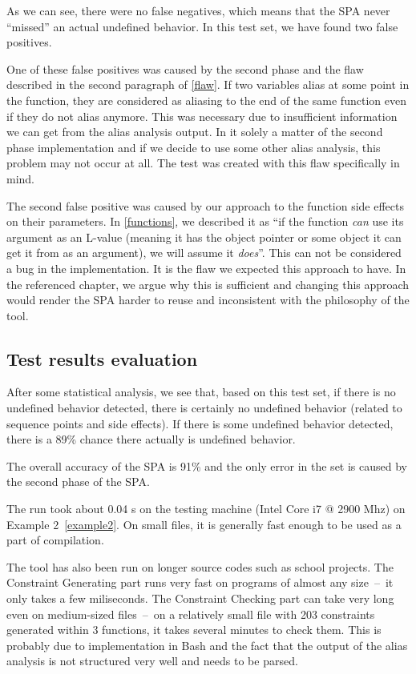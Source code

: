 As we can see, there were no false negatives, which means that the SPA never ``missed'' an actual undefined behavior. In this test set, we have found two false positives.

One of these false positives was caused by the second phase and the flaw described in the second paragraph of \ref{flaw}. If two variables alias at some point in the function, they are considered as aliasing to the end of the same function even if they do not alias anymore. This was necessary due to insufficient information we can get from the alias analysis output. In it solely a matter of the second phase implementation and if we decide to use some other alias analysis, this problem may not occur at all. The test was created with this flaw specifically in mind. %

The second false positive was caused by our approach to the function side effects on their parameters. In \ref{functions}, we described it as ``if the function \emph{can} use its argument as an L-value (meaning it has the object pointer or some object it can get it from as an argument), we will assume it \emph{does}''. This can not be considered a bug in the implementation. It is the flaw we expected this approach to have. In the referenced chapter, we argue why this is sufficient and changing this approach would render the SPA harder to reuse and inconsistent with the philosophy of the tool.

\subsection{Test results evaluation}

After some statistical analysis, we see that, based on this test set, if there is no undefined behavior detected, there is certainly no undefined behavior (related to sequence points and side effects). If there is some undefined behavior detected, there is a 89\% chance there actually is undefined behavior.

The overall accuracy of the SPA is 91\% and the only error in the set is caused by the second phase of the SPA.

The run took about 0.04 s on the testing machine (Intel Core i7 @ 2900 Mhz) on Example 2~\ref{example2}. On small files, it is generally fast enough to be used as a part of compilation.

The tool has also been run on longer source codes such as school projects. The Constraint Generating part runs very fast on programs of almost any size~--~it only takes a few miliseconds. The Constraint Checking part can take very long even on medium-sized files~--~on a relatively small file with 203 constraints generated within 3 functions, it takes several minutes to check them. This is probably due to implementation in Bash and the fact that the output of the alias analysis is not structured very well and needs to be parsed.

